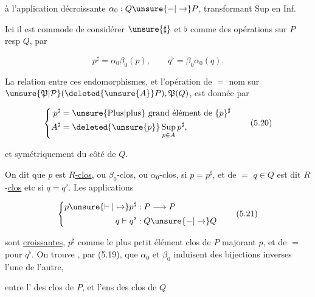à l'application décroissante $\alpha_0:Q\unsure{-|\to}P$, transformant Sup en Inf. 

Ici il  est commode de considérer $\unsure{\sharp}$ et $\flat$ comme des opérations sur $P$ resp $Q$, par

\[
 p^\sharp=\alpha_0\beta_0(p),\qquad q^\flat=\beta_0\alpha_0(q).
 \tag*{(5.19)}
\]

La relation entre ces endomorphismes, et l'opération de $=$ nom sur $\unsure{\mathfrak P|\mathcal P}(\deleted{\unsure{A}}P),\mathfrak P(Q)$, est donnée par

\[
 \left\{\begin{aligned}
 p^\sharp&=\text{\unsure{Plus|plus} grand élément de }\{p\}^\sharp\\
 A^\sharp&=\deleted{\unsure{p}}\mathop{\mathrm{Sup}}_{p\in A}p^\sharp,
 \end{aligned}\right.
 \tag*{(5.20)}
\]

et symétriquement du côté de $Q$.

 On dit que $p$ est \uline{$R$-clos}, ou $\beta_0$-clos, ou $\alpha_0$-clos, si $p=p^\sharp$, et de $=$ $q\in Q$ est dit $R$-\uline{clos} etc si $q=q^\flat$. Les  applications

\[
 \left\{\begin{aligned}
 p\unsure{\vdash|\mapsto} p^\sharp &: P\longrightarrow P\\
 q\vdash q^\flat &: Q\unsure{-|\to}Q
 \end{aligned}\right.
 \tag*{(5.21)}
\]

sont \uline{croissantes},    $p^\sharp$ comme le plus petit élément clos de $P$ majorant $p$, et de $=$ pour $q^\flat$. On trouve , par (5.19), que $\alpha_0$ et $\beta_0$ induisent des bijections inverses l'une de l'autre,

entre l' des  clos de $P$, et l'ens des  clos de $Q$


